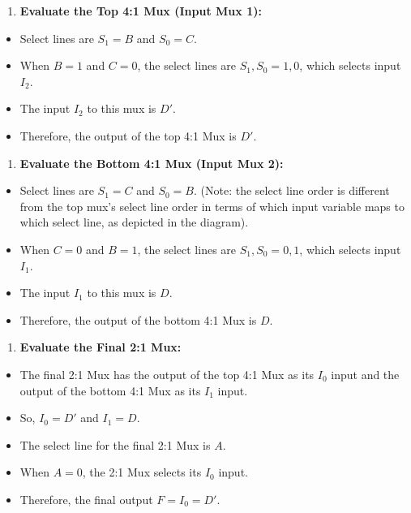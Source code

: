 \documentclass{article}
\begin{document}
\begin{itemize}
\begin{enumerate}
\item \textbf{Evaluate the Top 4:1 Mux (Input Mux 1):}

\end{enumerate}
    \begin{itemize}
        \item Select lines are $S_1=B$ and $S_0=C$.
        \item When $B=1$ and $C=0$, the select lines are ${S_1, S_0} = {1,0}$, which selects input $I_2$.
        \item The input $I_2$ to this mux is $D'$.
        \item Therefore, the output of the top 4:1 Mux is $D'$.
    \end{itemize}

\begin{enumerate}
\item \textbf{Evaluate the Bottom 4:1 Mux (Input Mux 2):}

\end{enumerate}
    \begin{itemize}
        \item Select lines are $S_1=C$ and $S_0=B$. (Note: the select line order is different from the top mux's select line order in terms of which input variable maps to which select line, as depicted in the diagram).
        \item When $C=0$ and $B=1$, the select lines are ${S_1, S_0} = {0,1}$, which selects input $I_1$.
        \item The input $I_1$ to this mux is $D$.
        \item Therefore, the output of the bottom 4:1 Mux is $D$.
    \end{itemize}

\begin{enumerate}
\item \textbf{Evaluate the Final 2:1 Mux:}

\end{enumerate}
    \begin{itemize}
        \item The final 2:1 Mux has the output of the top 4:1 Mux as its $I_0$ input and the output of the bottom 4:1 Mux as its $I_1$ input.
        \item So, $I_0 = D'$ and $I_1 = D$.
        \item The select line for the final 2:1 Mux is $A$.
        \item When $A=0$, the 2:1 Mux selects its $I_0$ input.
        \item Therefore, the final output $F = I_0 = D'$.
    \end{itemize}


\end{itemize}
\end{document}
